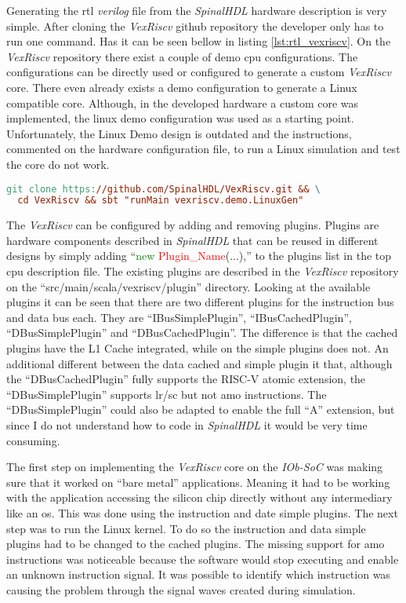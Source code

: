 Generating the \acrshort{rtl} \textit{verilog} file from the \textit{SpinalHDL} hardware description is very simple. After cloning the \textit{VexRiscv} github repository the developer only has to run one command. Has it can be seen bellow in listing \ref{lst:rtl_vexriscv}. On the \textit{VexRiscv} repository there exist a couple of demo \acrshort{cpu} configurations. The configurations can be directly used or configured to generate a custom \textit{VexRiscv} core. There even already exists a demo configuration to generate a Linux compatible core. Although, in the developed hardware a custom core was implemented, the linux demo configuration was used as a starting point. Unfortunately, the Linux Demo design is outdated and the instructions, commented on the hardware configuration file, to run a Linux simulation and test the core do not work.

\begin{lstlisting}[language=make, caption={Generate \textit{verilog} from \textit{SpinalHDL}}, label=lst:rtl_vexriscv] 
git clone https://github.com/SpinalHDL/VexRiscv.git && \
  cd VexRiscv && sbt "runMain vexriscv.demo.LinuxGen"
\end{lstlisting}

The \textit{VexRiscv} can be configured by adding and removing plugins. Plugins are hardware components described in \textit{SpinalHDL} that can be reused in different designs by simply adding \enquote{\textcolor{green}{new} \textcolor{red}{Plugin\_Name}(...),} to the plugins list in the top \acrshort{cpu} description file. The existing plugins are described in the \textit{VexRiscv} repository on the \enquote{src/main/scala/vexriscv/plugin} directory. Looking at the available plugins it can be seen that there are two different plugins for the instruction bus and data bus each. They are \enquote{IBusSimplePlugin}, \enquote{IBusCachedPlugin}, \enquote{DBusSimplePlugin} and \enquote{DBusCachedPlugin}. The difference is that the cached plugins have the L1 Cache integrated, while on the simple plugins does not. An additional different between the data cached and simple plugin it that, although the \enquote{DBusCachedPlugin} fully supports the RISC-V atomic extension, the \enquote{DBusSimplePlugin} supports \acrfull{lr}/\acrfull{sc} but not \acrfull{amo} instructions. The \enquote{DBusSimplePlugin} could also be adapted to enable the full \enquote{A} extension, but since I do not understand how to code in \textit{SpinalHDL} it would be very time consuming.

The first step on implementing the \textit{VexRiscv} core on the \textit{IOb-SoC} was making sure that it worked on \enquote{bare metal} applications. Meaning it had to be working with the application accessing the silicon chip directly without any intermediary like an \acrfull{os}. This was done using the instruction and date simple plugins. The next step was to run the Linux kernel. To do so the instruction and data simple plugins had to be changed to the cached plugins. The missing support for \acrfull{amo} instructions was noticeable because the software would stop executing and enable an unknown instruction signal. It was possible to identify which instruction was causing the problem through the signal waves created during simulation.

